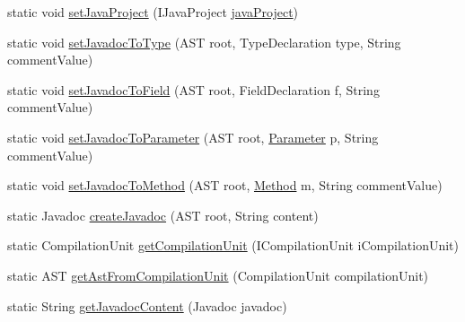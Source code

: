 \begin{DoxyCompactItemize}
\item 
static void \hyperlink{classit_1_1isislab_1_1masonassisteddocumentation_1_1mason_1_1analizer_1_1_global_utility_a3fea20282ae551e559bc44b549380c9f}{set\-Java\-Project} (I\-Java\-Project \hyperlink{classit_1_1isislab_1_1masonassisteddocumentation_1_1mason_1_1analizer_1_1_global_utility_aba72c531253eef1bc593a95ab7935605}{java\-Project})
\item 
static void \hyperlink{classit_1_1isislab_1_1masonassisteddocumentation_1_1mason_1_1analizer_1_1_global_utility_aaecb6f513d72c2ec9be2607934bca7e9}{set\-Javadoc\-To\-Type} (A\-S\-T root, Type\-Declaration type, String comment\-Value)
\item 
static void \hyperlink{classit_1_1isislab_1_1masonassisteddocumentation_1_1mason_1_1analizer_1_1_global_utility_a92660b0cf490a6351d8d953cad73da58}{set\-Javadoc\-To\-Field} (A\-S\-T root, Field\-Declaration f, String comment\-Value)
\item 
static void \hyperlink{classit_1_1isislab_1_1masonassisteddocumentation_1_1mason_1_1analizer_1_1_global_utility_aa6f8e91e0a132bdabad99dcf24bf249d}{set\-Javadoc\-To\-Parameter} (A\-S\-T root, \hyperlink{classit_1_1isislab_1_1masonassisteddocumentation_1_1mason_1_1analizer_1_1_parameter}{Parameter} p, String comment\-Value)
\item 
static void \hyperlink{classit_1_1isislab_1_1masonassisteddocumentation_1_1mason_1_1analizer_1_1_global_utility_a3b63ca16d34f0c412f5176ab7a2eb69d}{set\-Javadoc\-To\-Method} (A\-S\-T root, \hyperlink{classit_1_1isislab_1_1masonassisteddocumentation_1_1mason_1_1analizer_1_1_method}{Method} m, String comment\-Value)
\item 
static Javadoc \hyperlink{classit_1_1isislab_1_1masonassisteddocumentation_1_1mason_1_1analizer_1_1_global_utility_af4c7d391a631bece2ec533b8289044a6}{create\-Javadoc} (A\-S\-T root, String content)
\item 
static Compilation\-Unit \hyperlink{classit_1_1isislab_1_1masonassisteddocumentation_1_1mason_1_1analizer_1_1_global_utility_ad69b161f34e695d4fa210b4dc5c17026}{get\-Compilation\-Unit} (I\-Compilation\-Unit i\-Compilation\-Unit)
\item 
static A\-S\-T \hyperlink{classit_1_1isislab_1_1masonassisteddocumentation_1_1mason_1_1analizer_1_1_global_utility_adc9c8d328a9475dd27803cc9768b0053}{get\-Ast\-From\-Compilation\-Unit} (Compilation\-Unit compilation\-Unit)
\item 
static String \hyperlink{classit_1_1isislab_1_1masonassisteddocumentation_1_1mason_1_1analizer_1_1_global_utility_a7423663267626ca0368aa524d4a05b6e}{get\-Javadoc\-Content} (Javadoc javadoc)

\end{DoxyCompactItemize}
